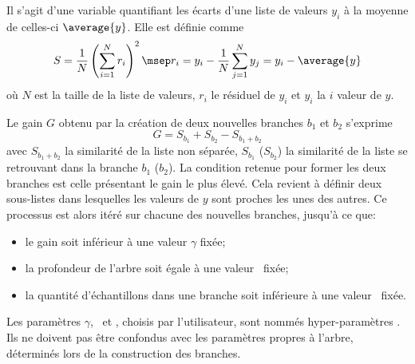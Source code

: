 Il s'agit d'une variable quantifiant les écarts d'une liste de valeurs $y_i$ à la moyenne de celles-ci $\average{y}$.
Elle est définie comme
\begin{equation}
S = \frac{1}{N} \left(\sum_{i=1}^N r_{i} \right)^2
\msep
r_i = y_i - \frac{1}{N} \sum_{j=1}^N y_j = y_i - \average{y}
\end{equation}
où $N$ est la taille de la liste de valeurs,
$r_i$ le résiduel de $y_i$
et $y_{i}$ la $i$ valeur de $y$.
\par
Le gain $G$ obtenu par la création de deux nouvelles branches $b_1$ et $b_2$ s'exprime
\begin{equation}
G = S_{b_1} + S_{b_2} - S_{b_1+b_2}
\end{equation}
avec
$S_{b_1+b_2}$ la similarité de la liste non séparée,
$S_{b_1}$ ($S_{b_2}$) la similarité de la liste se retrouvant dans la branche $b_1$ ($b_2$).
La condition retenue pour former les deux branches est celle présentant le gain le plus élevé.
Cela revient à définir deux sous-listes dans lesquelles les valeurs de $y$ sont proches les unes des autres.
Ce processus est alors itéré sur chacune des nouvelles branches, jusqu'à ce que:
\begin{itemize}
\item le gain soit inférieur à une valeur $\gamma$ fixée;
\item la profondeur de l'arbre soit égale à une valeur \MaxDepth\ fixée;
\item la quantité d'échantillons dans une branche soit inférieure à une valeur \MinChildWeight\ fixée.
\end{itemize}
Les paramètres $\gamma$, \MaxDepth\ et \MinChildWeight, choisis par l'utilisateur, sont nommés \og hyper-paramètres \fg.
Ils ne doivent pas être confondus avec les paramètres propres à l'arbre, déterminés lors de la construction des branches.
